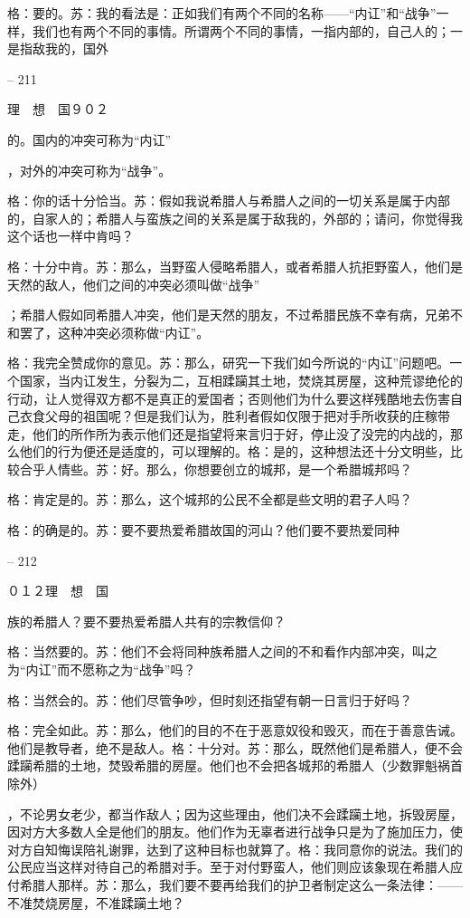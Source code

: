 \documentclass[11pt,oneside]{book}
\begin{document}
\begin{common-format}
    格：要的。苏：我的看法是：正如我们有两个不同的名称——“内讧”和“战争”一样，我们也有两个不同的事情。所谓两个不同的事情，一指内部的，自己人的；一是指敌我的，国外

    

-- 211

    理　想　国９０２

    的。国内的冲突可称为“内讧”

    ，对外的冲突可称为“战争”。

    格：你的话十分恰当。苏：假如我说希腊人与希腊人之间的一切关系是属于内部的，自家人的；希腊人与蛮族之间的关系是属于敌我的，外部的；请问，你觉得我这个话也一样中肯吗？

    格：十分中肯。苏：那么，当野蛮人侵略希腊人，或者希腊人抗拒野蛮人，他们是天然的敌人，他们之间的冲突必须叫做“战争”

    ；希腊人假如同希腊人冲突，他们是天然的朋友，不过希腊民族不幸有病，兄弟不和罢了，这种冲突必须称做“内讧”。

    格：我完全赞成你的意见。苏：那么，研究一下我们如今所说的“内讧”问题吧。一个国家，当内讧发生，分裂为二，互相蹂躏其土地，焚烧其房屋，这种荒谬绝伦的行动，让人觉得双方都不是真正的爱国者；否则他们为什么要这样残酷地去伤害自己衣食父母的祖国呢？但是我们认为，胜利者假如仅限于把对手所收获的庄稼带走，他们的所作所为表示他们还是指望将来言归于好，停止没了没完的内战的，那么他们的行为便还是适度的，可以理解的。格：是的，这种想法还十分文明些，比较合乎人情些。苏：好。那么，你想要创立的城邦，是一个希腊城邦吗？

    格：肯定是的。苏：那么，这个城邦的公民不全都是些文明的君子人吗？

    格：的确是的。苏：要不要热爱希腊故国的河山？他们要不要热爱同种

    

-- 212

    ０１２理　想　国

    族的希腊人？要不要热爱希腊人共有的宗教信仰？

    格：当然要的。苏：他们不会将同种族希腊人之间的不和看作内部冲突，叫之为“内讧”而不愿称之为“战争”吗？

    格：当然会的。苏：他们尽管争吵，但时刻还指望有朝一日言归于好吗？

    格：完全如此。苏：那么，他们的目的不在于恶意奴役和毁灭，而在于善意告诫。他们是教导者，绝不是敌人。格：十分对。苏：那么，既然他们是希腊人，便不会蹂躏希腊的土地，焚毁希腊的房屋。他们也不会把各城邦的希腊人（少数罪魁祸首除外）

    ，不论男女老少，都当作敌人；因为这些理由，他们决不会蹂躏土地，拆毁房屋，因对方大多数人全是他们的朋友。他们作为无辜者进行战争只是为了施加压力，使对方自知悔误陪礼谢罪，达到了这种目标也就算了。格：我同意你的说法。我们的公民应当这样对待自己的希腊对手。至于对付野蛮人，他们则应该象现在希腊人应付希腊人那样。苏：那么，我们要不要再给我们的护卫者制定这么一条法律：——不准焚烧房屋，不准蹂躏土地？


\end{common-format}
\end{document}
